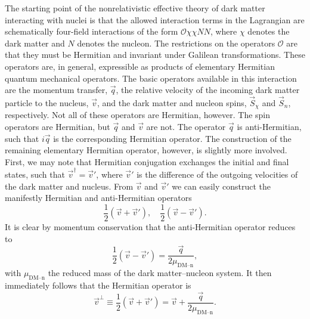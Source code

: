 The starting point of the nonrelativistic effective theory of dark matter interacting with nuclei is that the allowed interaction terms in the Lagrangian are schematically four-field interactions of the form $\mathcal{O}\chi\chi NN$, where $\chi$ denotes the dark matter and $N$ denotes the nucleon. The restrictions on the operators $\mathcal{O}$ are that they must be Hermitian and invariant under Galilean transformations. These operators are, in general, expressible as products of elementary Hermitian quantum mechanical operators. The basic operators available in this interaction are the momentum transfer, $\vec{q}$, the relative velocity of the incoming dark matter particle to the nucleus, $\vec{v}$, and the dark matter and nucleon spins, $\vec{S}_\chi$ and $\vec{S}_n$, respectively. Not all of these operators are Hermitian, however. The spin operators are Hermitian, but $\vec{q}$ and $\vec{v}$ are not. The operator $\vec{q}$ is anti-Hermitian, such that $i\vec{q}$ is the corresponding Hermitian operator. The construction of the remaining elementary Hermitian operator, however, is slightly more involved. First, we may note that Hermitian conjugation exchanges the initial and final states, such that $\vec{v}^\dagger=\vec{v}'$, where $\vec{v}'$ is the difference of the outgoing velocities of the dark matter and nucleus. From $\vec{v}$ and $\vec{v}'$ we can easily construct the manifestly Hermitian and anti-Hermitian operators
\begin{equation}
    \frac{1}{2}(\vec{v}+\vec{v}'),\quad\frac{1}{2}(\vec{v}-\vec{v}').
\end{equation}
It is clear by momentum conservation that the anti-Hermitian operator reduces to
\begin{equation}
    \frac{1}{2}(\vec{v}-\vec{v}')=\frac{\vec{q}}{2\mu_\text{DM--n}},
\end{equation}
with $\mu_\text{DM--n}$ the reduced mass of the dark matter--nucleon system. It then immediately follows that the Hermitian operator is
\begin{equation}
    \vec{v}^\perp\equiv\frac{1}{2}(\vec{v}+\vec{v}')=\vec{v}+\frac{\vec{q}}{2\mu_\text{DM--n}}.
\end{equation}

